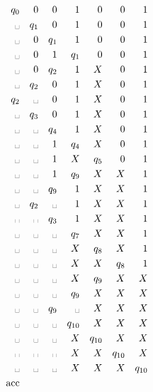 \documentclass[finnish,11pt,draft]{article}
\newcommand{\spc}{\text{\textvisiblespace}}
\begin{document}
\begin{enumerate}
\begin{enumerate}
    \begin{alignat}{13}
      q_0  &&  0    &&  0    && 1      &&  0      && 0      && 1      \\
      \spc &&  q_1  &&  0    && 1      &&  0      && 0      && 1      \\
      \spc &&  0    &&  q_1  && 1      &&  0      && 0      && 1      \\
      \spc &&  0    &&  1    && q_1    &&  0      && 0      && 1      \\
      \spc &&  0    &&  q_2  && 1      &&  X      && 0      && 1      \\
      \spc &&  q_2  &&  0    && 1      &&  X      && 0      && 1      \\
      q_2  &&  \spc &&  0    && 1      &&  X      && 0      && 1      \\
      \spc &&  q_3  &&  0    && 1      &&  X      && 0      && 1      \\
      \spc &&  \spc &&  q_4  && 1      &&  X      && 0      && 1      \\
      \spc &&  \spc &&  1    && q_4    &&  X      && 0      && 1      \\
      \spc &&  \spc &&  1    && X      &&  q_5    && 0      && 1      \\
      \spc &&  \spc &&  1    && q_9    &&  X      && X      && 1      \\
      \spc &&  \spc &&  q_9  && 1      &&  X      && X      && 1      \\
      \spc &&  q_2  &&  \spc && 1      &&  X      && X      && 1      \\
      \spc &&  \spc &&  q_3  && 1      &&  X      && X      && 1      \\
      \spc &&  \spc &&  \spc && q_7    &&  X      && X      && 1      \\
      \spc &&  \spc &&  \spc && X      &&  q_8    && X      && 1      \\
      \spc &&  \spc &&  \spc && X      &&  X      && q_8    && 1      \\
      \spc &&  \spc &&  \spc && X      &&  q_9    && X      && X      \\
      \spc &&  \spc &&  \spc && q_9    &&  X      && X      && X      \\
      \spc &&  \spc &&  q_9  && \spc   &&  X      && X      && X      \\
      \spc &&  \spc &&  \spc && q_{10} &&  X      && X      && X      \\
      \spc &&  \spc &&  \spc && X      &&  q_{10} && X      && X      \\
      \spc &&  \spc &&  \spc && X      &&  X      && q_{10} && X      \\
      \spc &&  \spc &&  \spc && X      &&  X      && X      && q_{10} \\
      \text{acc} &&&&&&
    \end{alignat}


\end{enumerate}
\end{enumerate}
\end{document}
